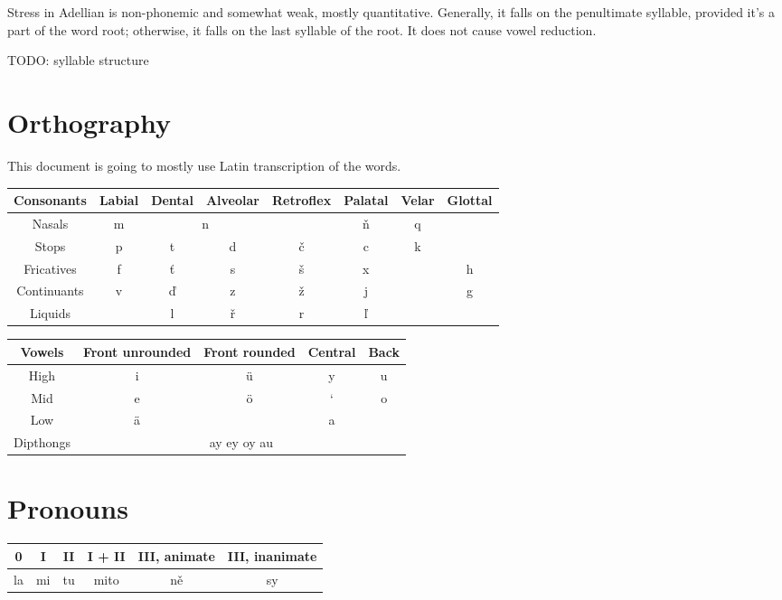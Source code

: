 \documentclass[12pt]{article}
\begin{document}
	Stress in Adellian is non-phonemic and somewhat weak, mostly quantitative. Generally, it falls on the penultimate syllable, provided it's a part of the word root; otherwise, it falls on the last syllable of the root. It does not cause vowel reduction.

	TODO: syllable structure

	\section{Orthography}

	This document is going to mostly use Latin transcription of the words. 

	\begin{tabular}{||c | c c c c c c c||}
		\hline
		Consonants & Labial & Dental & Alveolar &
		Retroflex & Palatal & Velar & Glottal \\
		\hline
		Nasals & m & \multicolumn{2}{c}{n} & & ň & q & \\
		Stops & p & t & d & č & c & k & \\
		Fricatives & f & ť & s & š & x & & h \\
		Continuants & v & ď & z & ž & j & & g \\	
		Liquids & & l & ř & r & ľ & & \\
		\hline
	\end{tabular}

	\begin{tabular}{|| c | c c c c || }
		\hline
	Vowels & Front unrounded & Front rounded & Central & Back \\
	\hline
	High & i & ü & y & u \\
	Mid & e & ö & ` & o \\
	Low & ä & & a & \\
	Dipthongs & \multicolumn{4}{c||}{ay ey oy au} \\
	\hline
	\end{tabular}

	\section{Pronouns}

	\begin{tabular}{|| c | c | c | c | c | c ||}
		\hline
		0 & I & II & I + II & III, animate & III, inanimate\\
		\hline
		la & mi & tu & mito & ně & sy\\
		\hline
	\end{tabular}
\end{document}
